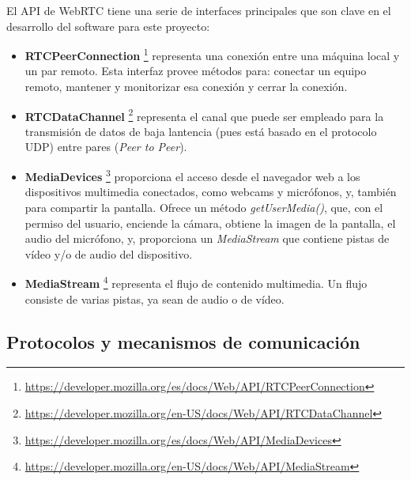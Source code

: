 \documentclass[a4paper, 12pt]{book}
\begin{document}
El API de WebRTC tiene una serie de interfaces principales que son clave en el desarrollo del software para este proyecto:

\begin{itemize}
\item \textbf{RTCPeerConnection} \footnote{\url{https://developer.mozilla.org/es/docs/Web/API/RTCPeerConnection}} representa una conexión entre una máquina local y un par remoto. Esta interfaz provee métodos para: conectar un equipo remoto, mantener y monitorizar esa conexión y cerrar la conexión.

\item \textbf{RTCDataChannel} \footnote{\url{https://developer.mozilla.org/en-US/docs/Web/API/RTCDataChannel}} representa el canal que puede ser empleado para la transmisión de datos de baja lantencia (pues está basado en el protocolo UDP) entre pares (\textit{Peer to Peer}).

\item \textbf{MediaDevices} \footnote{\url{https://developer.mozilla.org/es/docs/Web/API/MediaDevices}} proporciona el acceso desde el navegador web a los dispositivos multimedia conectados, como webcams y micrófonos, y, también para compartir la pantalla. Ofrece un método \textit{getUserMedia()}, que, con el permiso del usuario, enciende la cámara, obtiene la imagen de la pantalla, el audio del micrófono, y, proporciona un \textit{MediaStream} que contiene pistas de vídeo y/o de audio del dispositivo.

\item \textbf{MediaStream} \footnote{\url{https://developer.mozilla.org/en-US/docs/Web/API/MediaStream}} representa el flujo de contenido multimedia. Un flujo consiste de varias pistas, ya sean de audio o de vídeo.
\end{itemize}

\subsection{Protocolos y mecanismos de comunicación}
\label{subsec:protocolos}
\end{document}
